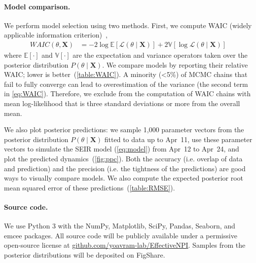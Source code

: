 \documentclass[12pt]{extarticle}
\let\vec\mathbf
\begin{document}
{%
\paragraph*{Model comparison.}
We perform model selection using two methods.
First, we compute WAIC (widely applicable information criterion)~\citep{gelman2013bayesian},
\begin{equation} \label{eq:WAIC}
\begin{aligned}
\mathit{WAIC}(\theta, \vec{X}) &= -2\log\mathbb{E}[\mathcal{L}(\theta \mid \vec{X})] + 2\mathbb{V}[\log\mathcal{L}(\theta \mid \vec{X})]
\end{aligned}
\end{equation}
where $\mathbb{E}[\cdot]$ and $\mathbb{V}[\cdot]$ are the expectation and variance operators taken over the posterior distribution $P(\theta \mid \vec{X})$.
We compare models by reporting their relative WAIC; lower is better~(\autoref{table:WAIC}).
A minority (<5\%) of MCMC chains that fail to fully converge can lead to overestimation of the variance (the second term in \autoref{eq:WAIC}).
Therefore, we exclude from the computation of WAIC chains with mean log-likelihood that is three standard deviations or more from the overall mean.  

We also plot posterior predictions: we sample 1,000 parameter vectors from the posterior distribution $P(\theta \mid \vec{X})$ fitted to data up to Apr~11, use these parameter vectors to simulate the SEIR model (\autoref{eq:model}) from Apr~12 to Apr~24, and plot the predicted dynamics~(\autoref{fig:ppc}).
Both the accuracy (i.e. overlap of data and prediction) and the precision (i.e. the tightness of the predictions) are good ways to visually compare models.
We also compute the expected posterior root mean squared error of these predictions~(\autoref{table:RMSE}).



\paragraph*{Source code.} 
We use Python 3 with the NumPy, Matplotlib, SciPy, Pandas, Seaborn, and emcee packages.
All source code will be publicly available under a permissive open-source license at \href{http://github.com/yoavram-lab/EffectiveNPI}{github.com/yoavram-lab/EffectiveNPI}.
Samples from the posterior distributions will be deposited on FigShare.
} %
\end{document}

